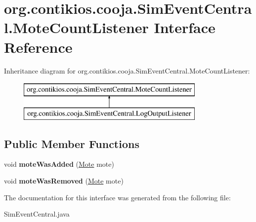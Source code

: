 \hypertarget{interfaceorg_1_1contikios_1_1cooja_1_1SimEventCentral_1_1MoteCountListener}{\section{org.\-contikios.\-cooja.\-Sim\-Event\-Central.\-Mote\-Count\-Listener Interface Reference}
\label{interfaceorg_1_1contikios_1_1cooja_1_1SimEventCentral_1_1MoteCountListener}
}
Inheritance diagram for org.\-contikios.\-cooja.\-Sim\-Event\-Central.\-Mote\-Count\-Listener\-:\begin{figure}[H]
\begin{center}
\leavevmode
\includegraphics[height=2.000000cm]{interfaceorg_1_1contikios_1_1cooja_1_1SimEventCentral_1_1MoteCountListener}
\end{center}
\end{figure}
\subsection*{Public Member Functions}
\begin{DoxyCompactItemize}
\item 
\hypertarget{interfaceorg_1_1contikios_1_1cooja_1_1SimEventCentral_1_1MoteCountListener_a7ddd29e4abb2cabd7048ec9e8324fdf8}{void {\bfseries mote\-Was\-Added} (\hyperlink{interfaceorg_1_1contikios_1_1cooja_1_1Mote}{Mote} mote)}\label{interfaceorg_1_1contikios_1_1cooja_1_1SimEventCentral_1_1MoteCountListener_a7ddd29e4abb2cabd7048ec9e8324fdf8}

\item 
\hypertarget{interfaceorg_1_1contikios_1_1cooja_1_1SimEventCentral_1_1MoteCountListener_ae960de6f3cff385573e67d6b443d7c6f}{void {\bfseries mote\-Was\-Removed} (\hyperlink{interfaceorg_1_1contikios_1_1cooja_1_1Mote}{Mote} mote)}\label{interfaceorg_1_1contikios_1_1cooja_1_1SimEventCentral_1_1MoteCountListener_ae960de6f3cff385573e67d6b443d7c6f}

\end{DoxyCompactItemize}


The documentation for this interface was generated from the following file\-:\begin{DoxyCompactItemize}
\item 
Sim\-Event\-Central.\-java\end{DoxyCompactItemize}
